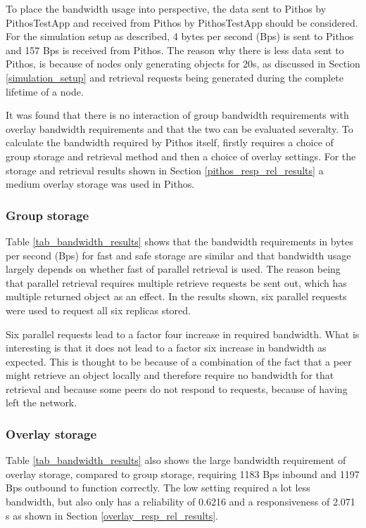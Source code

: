To place the bandwidth usage into perspective, the data sent to Pithos by PithosTestApp and received from Pithos by PithosTestApp should be considered. For the simulation setup as described, 4 bytes per second (Bps) is sent to Pithos and 157 Bps is received from Pithos. The reason why there is less data sent to Pithos, is because of nodes only generating objects for 20s, as discussed in Section \ref{simulation_setup} and retrieval requests being generated during the complete lifetime of a node.

It was found that there is no interaction of group bandwidth requirements with overlay bandwidth requirements and that the two can be evaluated severalty. To calculate the bandwidth required by Pithos itself, firstly requires a choice of group storage and retrieval method and then a choice of overlay settings. For the storage and retrieval results shown in Section \ref{pithos_resp_rel_results} a medium overlay storage was used in Pithos.

\subsubsection{Group storage}
Table \ref{tab_bandwidth_results} shows that the bandwidth requirements in bytes per second (Bps) for fast and safe storage are similar and that bandwidth usage largely depends on whether fast of parallel retrieval is used. The reason being that parallel retrieval requires multiple retrieve requests be sent out, which has multiple returned object as an effect. In the results shown, six parallel requests were used to request all six replicas stored.

Six parallel requests lead to a factor four increase in required bandwidth. What is interesting is that it does not lead to a factor six increase in bandwidth as expected. This is thought to be because of a combination of the fact that a peer might retrieve an object locally and therefore require no bandwidth for that retrieval and because some peers do not respond to requests, because of having left the network.

\subsubsection{Overlay storage}
Table \ref{tab_bandwidth_results} also shows the large bandwidth requirement of overlay storage, compared to group storage, requiring 1183 Bps inbound and 1197 Bps outbound to function correctly. The low setting required a lot less bandwidth, but also only has a reliability of 0.6216 and a responsiveness of 2.071 s as shown in Section \ref{overlay_resp_rel_results}.


